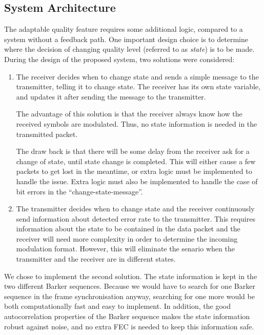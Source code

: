 
 
\subsection{System Architecture}
The adaptable quality feature requires some additional logic, compared to a system without a feedback path. One important design choice is to determine where the decision of changing quality level (referred to as \textit{state}) is to be made. During the design of the proposed system, two solutions were considered:
\begin{enumerate}
\item 
The receiver decides when to change state and sends a simple message to the transmitter, telling it to change state. The receiver has its own state variable, and updates it after sending the message to the transmitter.

The advantage of this solution is that the receiver always know how the received symbols are modulated. Thus, no state information is needed in the transmitted packet. 

The draw back is that there will be some delay from the receiver ask for a change of state, until state change is completed. This will either cause a few packets to get lost in the meantime, or extra logic must be implemented to handle the issue. Extra logic must also be implemented to handle the case of bit errors in the ``change-state-message''.

\item
The transmitter decides when to change state and the receiver continuously send information about detected error rate to the transmitter. This requires information about the state to be contained in the data packet and the receiver will need more complexity in order to determine the incoming modulation format. 
However, this will eliminate the senario when the transmitter and the receiver are in different states. 
\end{enumerate}
We chose to implement the second solution. The state information is kept in the two different Barker sequences. Because we would have to search for one Barker sequence in the frame synchronisation anyway, searching for one more would be both computationally fast and easy to implement. In addition, the good autocorrelation properties of the Barker sequence makes the state information robust against noise, and no extra FEC is needed to keep this information safe. 

